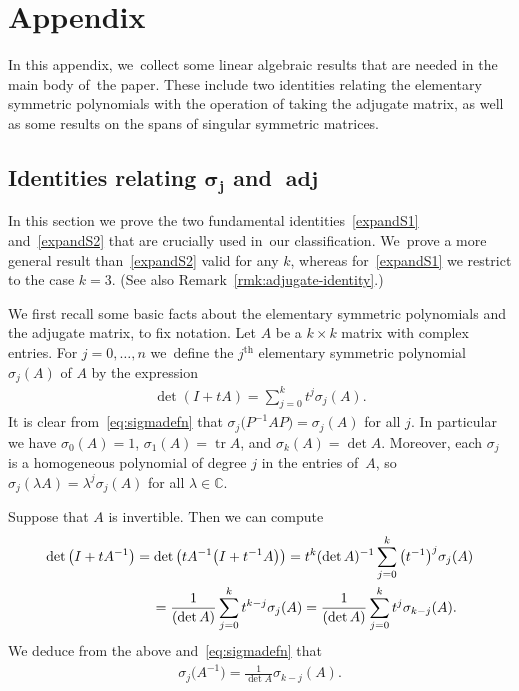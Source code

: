 \documentclass[10pt,a4paper]{amsart}
\def\C{\mathbb{C}}
\def\adj{\operatorname{adj}}
\def\tr{\operatorname{tr}}
\numberwithin{equation}{section}
\begin{document}
\section{Appendix}%

In this appendix, we~collect some linear algebraic results that are needed in the main body of~the paper. These include two identities relating the elementary symmetric polynomials with the operation of taking the adjugate matrix, as well as some results on the spans of singular symmetric matrices.

\subsection[Identities relating sigma j and adj]
{Identities relating $\boldsymbol{\sigma_j}$ and $\boldsymbol{\adj}$} \label{sec:sigma-adj}
In this section we prove the two fundamental identities~\eqref{expandS1} and~\eqref{expandS2} that are crucially used in~our classification. We~prove a more general result than~\eqref{expandS2} valid for any $k$, whereas for~\eqref{expandS1} we restrict to the case $k=3$. (See also Remark~\ref{rmk:adjugate-identity}.)

We first recall some basic facts about the elementary symmetric polynomials and the adjugate matrix, to fix notation. Let $A$ be a $k \times k$ matrix with complex entries. For $j=0, \dots, n$ we~define the $j^{\text{th}}$ elementary symmetric polynomial $\sigma_j(A)$ of $A$ by the expression
\begin{gather} \label{eq:sigmadefn}
\det (I + t A) = \sum_{j=0}^k t^j \sigma_j (A).
\end{gather}
It is clear from~\eqref{eq:sigmadefn} that $\sigma_j \big(P^{-1} A P\big) = \sigma_j (A)$ for all $j$. In particular we have $\sigma_0 (A) = 1$, $\sigma_1(A) = \tr A$, and $\sigma_k (A) = \det A$. Moreover, each $\sigma_j$ is a homogeneous polynomial of degree $j$ in the entries of~$A$, so $\sigma_j (\lambda A) = \lambda^j \sigma_j (A)$ for all $\lambda \in \C$.

Suppose that $A$ is invertible. Then we can compute
\begin{gather*}
\det\big(I + t A^{-1}\big) = \det \big(t A^{-1} \big(I + t^{-1} A\big) \big) = t^k (\det A)^{-1} \sum_{j=0}^k \big(t^{-1}\big)^j \sigma_j (A)
\\ \hphantom{\det\big(I + t A^{-1}\big)}
 {}= \frac{1}{(\det A)} \sum_{j=0}^k t^{k-j} \sigma_j (A) = \frac{1}{(\det A)} \sum_{j=0}^k t^j \sigma_{k-j}(A).
\end{gather*}
We deduce from the above and~\eqref{eq:sigmadefn} that
\begin{gather} \label{eq:sigmaAinverse}
\sigma_j \big(A^{-1}\big) = \frac{1}{\det A} \sigma_{k-j} (A).
\end{gather}
\end{document}
